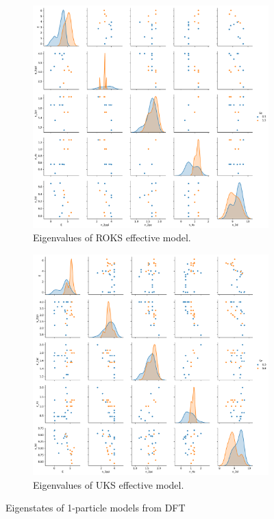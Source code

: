 \documentclass{article}
\begin{document}
\begin{figure}
\centering
\begin{subfigure}{.5\textwidth}
  \centering
  \includegraphics[width=\linewidth]{../qwalk/ub3lyp_s1_/analysis/roks_eigenvalues.pdf}
  \caption{Eigenvalues of ROKS effective model.}
  \label{fig:sub3}
\end{subfigure}%
\begin{subfigure}{.5\textwidth}
  \centering
  \includegraphics[width=\linewidth]{../qwalk/ub3lyp_s1_/analysis/uks_eigenvalues.pdf}
  \caption{Eigenvalues of UKS effective model.}
  \label{fig:sub4}
\end{subfigure}
\label{fig:test2}
\caption{Eigenstates of 1-particle models from DFT}
\end{figure}
\end{document}
